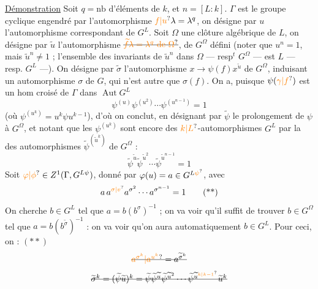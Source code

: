 \uline{Démonstration} Soit $q=\text{nb d'éléments de }k$, et $n=[L:k]$.
$\Gamma$ est le groupe cyclique engendré par l'automorphisme $\unsure{f|u}\lambda=\lambda^q$, on désigne par $u$ l'automorphisme correspondant de $G^L$. Soit $\Omega$ une clôture algébrique de $L$, on désigne par $\widetilde u$ l'automorphisme $\deleted{\unsure{\widetilde f\lambda=\lambda^q\text{ de }\Omega}}$,     de $G^\Omega$  défini  (noter que $u^n=1$, mais $\widetilde u^n\ne1$ ; l'ensemble des invariants de $\widetilde u^n$ dans $\Omega$ --- resp$^t$ $G^\Omega$ --- est $L$ --- resp. $G^L$ ---).
On désigne par $\widetilde\sigma$ l'automorphisme $x\longrightarrow\psi(f)x^{\widetilde u}$ de $G^\Omega$, induisant un automorphisme $\sigma$ de $G$, qui n'est autre que $\sigma(f)$. On a, puisque $\psi(\unsure{\gamma|f})$ est un  hom croisé de $\Gamma$ dans $\operatorname{Aut}G^L$
\[
\psi^{(u)}\psi^{(u^2)}\cdots\psi^{(u^{n-1})}=1
\]
(où $\psi^{(u^k)}=u^k\psi u^{k-1}$), d'où on conclut, en désignant par $\widetilde\psi$ le prolongement de $\psi$ à $G^\Omega$, et notant que les $\psi^{(u^k)}$ sont encore des $\unsure{k|L}$-automorphismes  $G^L$ par la  des automorphismes $\widetilde\psi^{(\widetilde u^k)}$ de $G^\Omega$ :
\[
\widetilde\psi^{\widetilde u}\widetilde\psi^{\widetilde u^2}\cdots\widetilde\psi^{\widetilde u^{n-1}}=1 \tag*{(*)}
\]
Soit $\unsure{\varphi|\phi}\in Z^1(\Gamma,G^{L\psi})$, donné par $\varphi(u)=a\in G^{L\unsure{\psi}}$, avec
\[
a\,a^{\unsure{\sigma|v}}a^{\sigma^2}\cdots a^{\sigma^{n-1}}=1 \tag*{(**)}
\]
On cherche $b\in G^L$ tel que $a=b(b^\sigma)^{-1}$ ; on va voir qu'il suffit de  trouver $b\in G^\Omega$ tel que $a=b(b^{\widetilde\sigma})^{-1}$ : on va voir qu'on aura automatiquement $b\in G^L$.
Pour ceci, on   :  $(**)$
\[
\deleted{\unsure{a^{\sigma^k}|a^{u^k}}=a^{\widetilde\sigma^k}}
\]
\[
\deleted{\widetilde\sigma^k=(\widetilde\psi\widetilde u)^k=\widetilde\psi\widetilde\psi^{\widetilde u}\widetilde\psi^{\widetilde u^2}\cdots\widetilde\psi^{\widetilde u^{\unsure{k|k-1}}}\widetilde u^k}
\]
